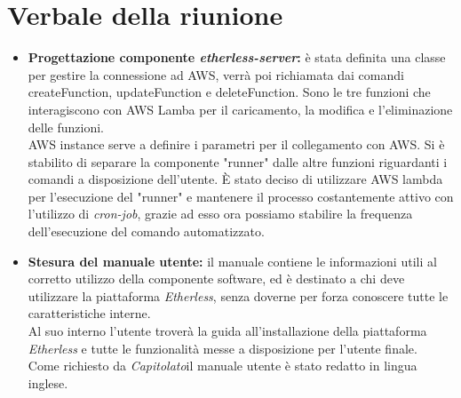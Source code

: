\section{Verbale della riunione}
	\begin{itemize}
		\item \textbf{Progettazione componente \textit{etherless-server}:} 
		è stata definita una classe per gestire la connessione ad AWS, verrà poi richiamata dai comandi createFunction, updateFunction e deleteFunction. Sono le tre funzioni che interagiscono con AWS Lamba per il caricamento, la modifica e l'eliminazione delle funzioni.\\
		AWS instance serve a definire i parametri per il collegamento con AWS.
		Si è stabilito di separare la componente "runner" dalle altre funzioni riguardanti i comandi a disposizione dell'utente.
		È stato deciso di utilizzare AWS lambda per l'esecuzione del "runner" e mantenere il processo costantemente attivo con l'utilizzo di \textit{cron-job\glos}, grazie ad esso ora possiamo stabilire la frequenza dell'esecuzione del comando automatizzato.
		
		\item \textbf{Stesura del manuale utente:} 
		il manuale contiene le informazioni utili al corretto utilizzo della componente software, ed è destinato a chi deve utilizzare la piattaforma \textit{Etherless}, senza doverne per forza conoscere tutte le caratteristiche interne.\\
		Al suo interno l'utente troverà la guida all'installazione della piattaforma \textit{Etherless} e tutte le funzionalità messe a disposizione per l'utente finale.\\
		Come richiesto da \textit{Capitolato}\glo il manuale utente è stato redatto in lingua inglese.
		
	\end{itemize}
